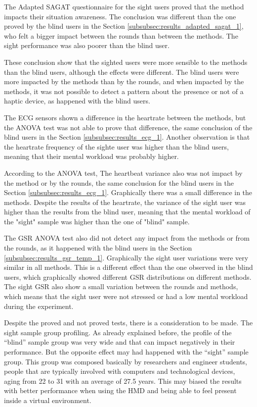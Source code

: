 The Adapted SAGAT questionnaire for the sight users proved that the method impacts their situation awareness. The conclusion was different than the one proved by the blind users in the Section \ref{subsubsec:results_adapted_sagat_1}, who felt a bigger impact between the rounds than between the methods. The sight performance was also poorer than the blind user.

These conclusion show that the sighted users were more sensible to the methods than the blind users, although the effects were different. The blind users were more impacted by the methods than by the rounds, and when impacted by the methods, it was not possible to detect a pattern about the presence or not of a haptic device, as happened with the blind users.

The ECG sensors shown a difference in the heartrate between the methods, but the ANOVA test was not able to prove that difference, the same conclusion of the blind users in the Section \ref{subsubsec:results_ecg_1}. Another observation is that the heartrate frequency of the sighte user was higher than the blind users, meaning that their mental workload was probably higher.

According to the ANOVA test, The heartbeat variance also was not impact by the method or by the rounds, the same conclusion for the blind users in the Section \ref{subsubsec:results_ecg_1}. Graphically there was a small difference in the methods. Despite the results of the heartrate, the variance of the sight user was higher than the results from the blind user, meaning that the mental workload of the "sight" sample was higher than the one of "blind" sample.

The GSR ANOVA test also did not detect any impact from the methods or from the rounds, as it happened with the blind users in the Section \ref{subsubsec:results_gsr_temp_1}. Graphically the sight user variations were very similar in all methods. This is a different effect than the one observed in the blind users, which graphically showed different GSR distributions on different methods. The sight GSR also show a small variation between the rounds and methods, which means that the sight user were not stressed or had a low mental workload during the experiment.

Despite the proved and not proved tests, there is a consideration to be made. The sight sample group profiling. As already explained before, the profile of the “blind” sample group was very wide and that can impact negatively in their performance. But the opposite effect may had happened with the “sight” sample group. This group was composed basically by researchers and engineer students, people that are typically involved with computers and technological devices, aging from 22 to 31 with an average of 27.5 years. This may biased the results with better performance when using the HMD and being able to feel present inside a virtual environment.


